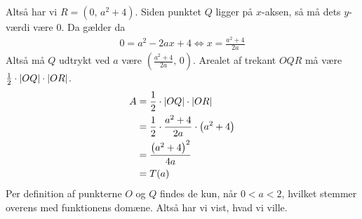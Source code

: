 \documentclass{article}
\begin{document}
Altså har vi $R=(0,\,a^2+4)$.
Siden punktet $Q$ ligger på $x$-aksen, så må dets $y$-værdi være 0.
Da gælder da
\begin{equation*}
\begin{split}
  0=a^2-2ax+4 \iff x=\frac{a^2+4}{2a}
\end{split}
\end{equation*}
Altså må $Q$ udtrykt ved $a$ være $\left(\frac{a^2+4}{2a},\, 0\right)$.
Arealet af trekant $OQR$ må være $\frac{1}{2} \cdot \abs{OQ} \cdot \abs{OR} $. 
\begin{equation*}
\begin{split}
  A&=\frac{1}{2} \cdot \abs{OQ} \cdot \abs{OR}\\
  &=\frac{1}{2} \cdot \frac{a^2+4}{2a} \cdot \left(a^2+4\right) \\
  &=\frac{\left(a^2+4\right)^2}{4a}\\
  &=T(a)
\end{split}
\end{equation*}
Per definition af punkterne $O$ og $Q$ findes de kun, når $0<a<2$, hvilket stemmer overens med funktionens domæne.
Altså har vi vist, hvad vi ville.
\end{document}
